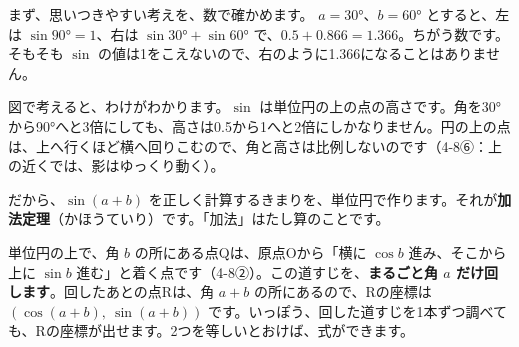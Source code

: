 まず、思いつきやすい考えを、数で確かめます。
\noindent $a=30°$、$b=60°$ とすると、左は $\sin90°=1$、右は $\sin30°+\sin60°$ で、$0.5+0.866=1.366$。ちがう数です。そもそも $\sin$ の値は1をこえないので、右のように1.366になることはありません。
\par\vspace{6pt}
\noindent\begin{minipage}[c]{0.55\linewidth}
\raggedright
図で考えると、わけがわかります。$\sin$ は単位円の上の点の高さです。角を30°から90°へと3倍にしても、高さは0.5から1へと2倍にしかなりません。円の上の点は、上へ行くほど横へ回りこむので、角と高さは比例しないのです（4-8⑥：上の近くでは、影はゆっくり動く）。

だから、$\sin(a+b)$ を正しく計算するきまりを、単位円で作ります。それが\textbf{加法定理}（かほうていり）です。「加法」はたし算のことです。
\end{minipage}\hfill
\begin{minipage}[c]{0.4\linewidth}
\centering
{}
\end{minipage}


\leavevmode\label{bk:4-9:kahou}単位円の上で、角 $b$ の所にある点Qは、原点Oから「横に $\cos b$ 進み、そこから上に $\sin b$ 進む」と着く点です（4-8②）。この道すじを、\textbf{まるごと角 $a$ だけ回します}。回したあとの点Rは、角 $a+b$ の所にあるので、Rの座標は $(\cos(a+b),\ \sin(a+b))$ です。いっぽう、回した道すじを1本ずつ調べても、Rの座標が出せます。2つを等しいとおけば、式ができます。

